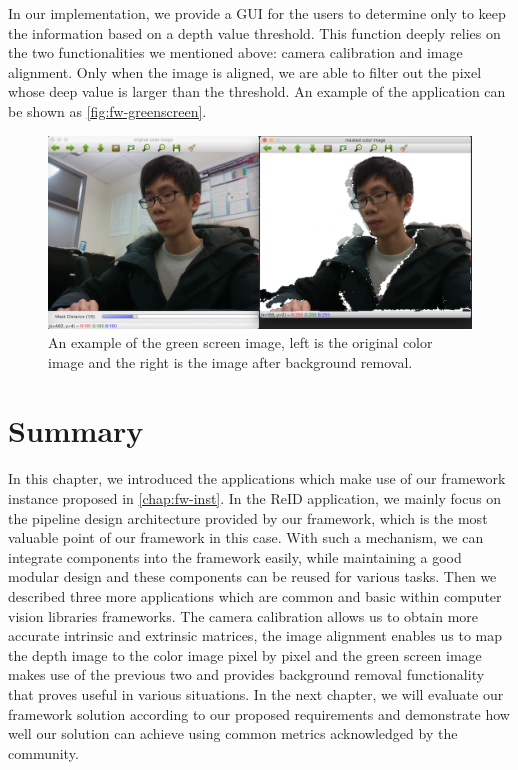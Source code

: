 In our implementation, we provide a GUI for the users to determine
only to keep the information based on a depth value threshold. This function
deeply relies on the two functionalities we mentioned above: camera calibration
and image alignment. Only when the image is aligned, we are able to filter out
the pixel whose deep value is larger than the threshold. An example of the
application can be shown as \autoref{fig:fw-greenscreen}.

\begin{figure}
    \includegraphics[width=\linewidth]{figures/framework_greenscreen.png}
    \caption[An example of the green screen image]
    {An example of the green screen image, left is the original color
        image and the right is the image after background removal.}
    \label{fig:fw-greenscreen}
\end{figure}

\section{Summary}

In this chapter, we introduced the applications which make use of our framework
instance proposed in \autoref{chap:fw-inst}. In the ReID application, we mainly
focus on the pipeline design architecture provided by our framework, which is the most valuable point of our
framework in this case. With such a mechanism, we can integrate components into the
framework easily, while maintaining a good modular design and these
components can be reused for various tasks.
Then we described three more applications which are common and basic
within computer vision libraries frameworks. 
The camera calibration allows us to obtain more accurate intrinsic and 
extrinsic matrices, the image alignment
enables us to map the depth image to the color image pixel by pixel and the
green screen image makes use of the previous two and provides background
removal functionality that proves useful in various situations.
In the next chapter, we will evaluate our framework solution according to our 
proposed requirements and demonstrate how well our solution can achieve using 
common metrics acknowledged by the community.



%
